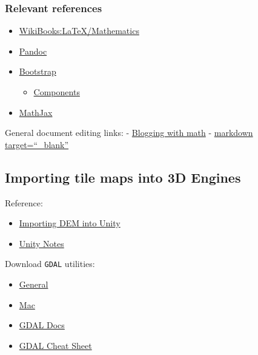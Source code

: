 \documentclass[]{article}
\begin{document}
\subsubsection{Relevant references}\label{relevant-references}

\begin{itemize}
\itemsep1pt\parskip0pt
\item
  \href{http://en.wikibooks.org/wiki/LaTeX/Mathematics}{WikiBooks:LaTeX/Mathematics}
\item
  \href{http://johnmacfarlane.net/pandoc/README.html}{Pandoc}
\item
  \href{http://getbootstrap.com/}{Bootstrap}

  \begin{itemize}
  \itemsep1pt\parskip0pt
  \item
    \href{http://getbootstrap.com/components/}{Components}
  \end{itemize}
\item
  \href{http://www.mathjax.org/}{MathJax}
\end{itemize}

General document editing links: -
\href{http://drz.ac/2013/01/03/blogging-with-math/}{Blogging with math}
-
\href{http://stackoverflow.com/questions/4425198/markdown-target-blank}{markdown
target=``\_blank''}

\subsection{Importing tile maps into 3D
Engines}\label{importing-tile-maps-into-3d-engines}

Reference:

\begin{itemize}
\itemsep1pt\parskip0pt
\item
  \href{http://alastaira.wordpress.com/2013/11/12/importing-dem-terrain-heightmaps-for-unity-using-gdal/}{Importing
  DEM into Unity}
\item
  \href{http://forum.unity3d.com/threads/23851-importing-real-maps-(DEMs)-into-unity}{Unity
  Notes}
\end{itemize}

Download \texttt{GDAL} utilities:

\begin{itemize}
\itemsep1pt\parskip0pt
\item
  \href{http://trac.osgeo.org/gdal/wiki/DownloadingGdalBinaries}{General}
\item
  \href{http://www.kyngchaos.com/software:frameworks}{Mac}
\item
  \href{http://www.gdal.org/gdal_translate.html}{GDAL Docs}
\item
  \href{https://github.com/dwtkns/gdal-cheat-sheet}{GDAL Cheat Sheet}
\end{itemize}
\end{document}
